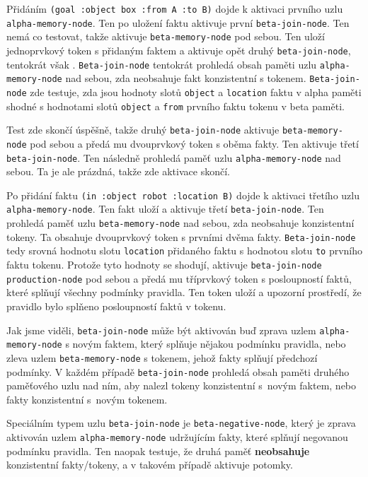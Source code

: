 Přidáním \verb|(goal :object box :from A :to B)| dojde k aktivaci prvního uzlu
\verb|alpha-memory-node|. Ten po uložení faktu aktivuje první
\verb|beta-join-node|. Ten nemá co testovat, takže aktivuje
\verb|beta-memory-node| pod sebou. Ten uloží jednoprvkový token s přidaným
faktem a aktivuje opět druhý \verb|beta-join-node|, tentokrát však .
\verb|Beta-join-node| tentokrát prohledá obsah paměti uzlu \verb|alpha-memory-node|
nad sebou, zda neobsahuje fakt konzistentní s tokenem. \verb|Beta-join-node| zde
testuje, zda jsou hodnoty slotů \verb|object| a \verb|location| faktu v alpha
paměti shodné s hodnotami slotů \verb|object| a \verb|from| prvního faktu tokenu v
beta paměti.

Test zde skončí úspěšně, takže druhý \verb|beta-join-node| aktivuje
\verb|beta-memory-node| pod sebou a předá mu dvouprvkový token s oběma fakty.
Ten aktivuje  třetí \verb|beta-join-node|. Ten následně prohledá paměť
uzlu \verb|alpha-memory-node| nad sebou. Ta je ale prázdná, takže zde aktivace
skončí.

Po přidání faktu \verb|(in :object robot :location B)| dojde k aktivaci třetího
uzlu \verb|alpha-memory-node|. Ten fakt uloží a aktivuje  třetí
\verb|beta-join-node|. Ten prohledá paměť uzlu \verb|beta-memory-node| nad sebou, zda
neobsahuje konzistentní tokeny. Ta obsahuje dvouprvkový token s prvními dvěma
fakty. \verb|Beta-join-node| tedy srovná hodnotu slotu \verb|location| přidaného
faktu s hodnotou slotu \verb|to| prvního faktu tokenu. Protože tyto hodnoty se
shodují, aktivuje \verb|beta-join-node| \verb|production-node| pod sebou a předá
mu tříprvkový token s posloupností faktů, které splňují všechny podmínky
pravidla. Ten token uloží a upozorní prostředí, že pravidlo bylo splňeno
posloupností faktů v tokenu.

Jak jsme viděli, \verb|beta-join-node| může být aktivován buď zprava uzlem
\verb|alpha-memory-node| s novým faktem, který splňuje nějakou podmínku
pravidla, nebo zleva uzlem \verb|beta-memory-node| s tokenem, jehož fakty splňují
předchozí podmínky. V každém případě \verb|beta-join-node| prohledá obsah paměti
druhého paměťového uzlu nad ním, aby nalezl tokeny konzistentní s~novým faktem,
nebo fakty konzistentní s~novým tokenem.

Speciálním typem uzlu \verb|beta-join-node| je \verb|beta-negative-node|, který je
zprava aktivován uzlem \verb|alpha-memory-node| udržujícím fakty, které splňují
negovanou podmínku pravidla. Ten naopak testuje, že druhá paměť
\textbf{neobsahuje} konzistentní fakty/tokeny, a v takovém případě aktivuje
potomky.

